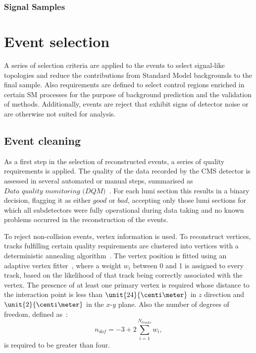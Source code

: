 \subsubsection{Signal Samples}

\section{Event selection}
A series of selection criteria are applied to the events to select signal-like topologies and reduce the contributions from Standard Model backgrounds to the final sample. Also requirements are defined to select control regions enriched in certain SM processes for the purpose of background prediction and the validation of methods. Additionally, events are reject that exhibit signs of detector noise or are otherwise not suited for analysis. 
\subsection{Event cleaning}
As a first step in the selection of reconstructed events, a series of quality requirements is applied. 
The quality of the data recorded by the CMS detector is assessed in several automated or manual steps, summarised as $\textit{Data quality monitoring (DQM)}$~\cite{DQM}. For each lumi section this results in a binary decision, flagging it as either $\textit{good}$ or $\textit{bad}$, accepting only those lumi sections for which all subdetectors were fully operational during data taking and no known problems occurred in the reconstruction of the events.

To reject non-collision events, vertex information is used. To reconstruct vertices, tracks fulfilling certain quality requirements are clustered into vertices with a deterministic annealing algorithm~\cite{DertermisiticAnnealing,Chatrchyan:2014fea}. The vertex position is fitted using an adaptive vertex fitter~\cite{Fruehwirth:1027031}, where a weight $w_i$ between 0 and 1 is assigned to every track, based on the likelihood of that track being correctly associated with the vertex. The presence of at least one primary vertex is required whose distance to the interaction point is less than $\unit{24}{\centi\meter}$ in $z$ direction and $\unit{2}{\centi\meter}$ in the $x$-$y$ plane. Also the number of degrees of freedom, defined as~\cite{Chatrchyan:2014fea}:
\begin{equation}
n_{dof} = -3 + 2 \sum\limits_{i=1}^{N_{tracks}} w_i,
\end{equation}
is required to be greater than four.  

